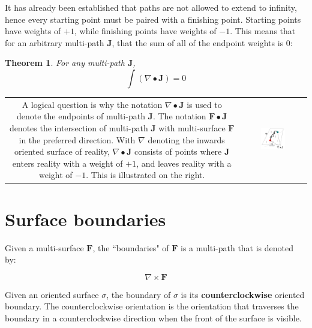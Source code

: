 \documentclass{book}
\newtheorem{thm}{Theorem}
\begin{document}
It has already been established that paths are not allowed to extend to infinity, hence every starting point must be paired with a finishing point. Starting points have weights of \(+1\), while finishing points have weights of \(-1\). This means that for an arbitrary multi-path \(\mathbf{J}\), that the sum of all of the endpoint weights is \(0\): 
\begin{thm}
For any multi-path \(\mathbf{J}\),
\[\int (\nabla \bullet \mathbf{J}) = 0\] 
\end{thm}

\begin{tabular}{cc}
\parbox{0.5\textwidth}{
A logical question is why the notation \(\nabla \bullet \mathbf{J}\) is used to denote the endpoints of multi-path \(\mathbf{J}\). The notation \(\mathbf{F} \bullet \mathbf{J}\) denotes the intersection of multi-path \(\mathbf{J}\) with multi-surface \(\mathbf{F}\) in the preferred direction. With \(\nabla\) denoting the inwards oriented surface of reality, \(\nabla \bullet \mathbf{J}\) consists of points where \(\mathbf{J}\) enters reality with a weight of \(+1\), and leaves reality with a weight of \(-1\). This is illustrated on the right.
} & \parbox{0.4\textwidth}{
\includegraphics[width = 0.4\textwidth]{Boundaries/Path_endpoints/path_surface_intersections_and_path_endpoints}
}
\end{tabular}




\section{Surface boundaries}

Given a multi-surface \(\mathbf{F}\), the ``boundaries" of \(\mathbf{F}\) is a multi-path that is denoted by: 

\[\nabla \times \mathbf{F}\]

Given an oriented surface \(\sigma\), the boundary of \(\sigma\) is its {\bf counterclockwise} oriented boundary. The counterclockwise orientation is the orientation that traverses the boundary in a counterclockwise direction when the front of the surface is visible. 
\end{document}
